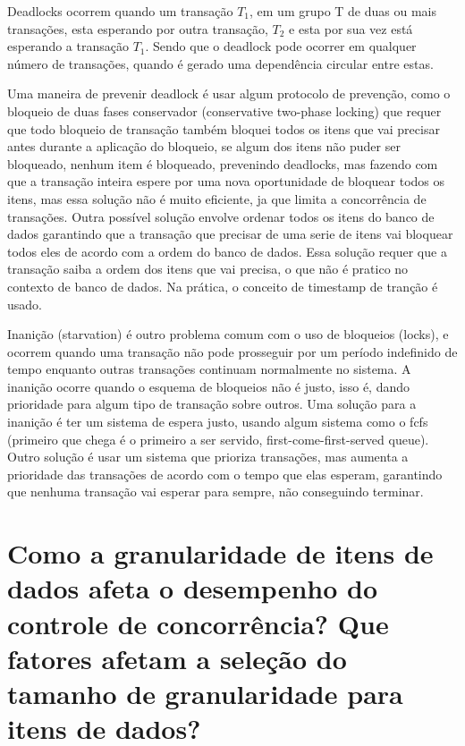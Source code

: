 \documentclass[a4paper,10pt]{article}
\begin{document}
Deadlocks ocorrem quando um transação $T_1$, em um grupo T de duas ou mais transações, esta esperando por outra transação, $T_2$ e esta por sua vez está esperando a transação $T_1$. Sendo que o deadlock pode ocorrer em qualquer número de transações, quando é gerado uma dependência circular entre estas.

Uma maneira de prevenir deadlock é usar algum protocolo de prevenção, como o bloqueio de duas fases conservador (conservative two-phase locking) que requer que todo bloqueio de  transação também bloquei todos os itens que vai precisar antes durante a aplicação do bloqueio, se algum dos itens não puder ser bloqueado, nenhum item é bloqueado, prevenindo deadlocks, mas fazendo com que a transação inteira espere por uma nova oportunidade de bloquear todos os itens, mas essa solução não é muito eficiente, ja que limita a concorrência de transações.
Outra possível solução envolve ordenar todos os itens do banco de dados garantindo que a transação que precisar de uma serie de itens vai bloquear todos eles de acordo com a ordem do banco de dados. Essa solução requer que a transação saiba a ordem dos itens que vai precisa, o que não é pratico no contexto de banco de dados. Na prática, o conceito de timestamp de tranção é usado.

Inanição (starvation) é outro problema comum com o uso de bloqueios (locks), e ocorrem quando uma transação não pode prosseguir por um período indefinido de tempo enquanto outras transações continuam normalmente no sistema. A inanição ocorre quando o esquema de bloqueios não é justo, isso é, dando prioridade para algum tipo de transação sobre outros.
Uma solução para a inanição é ter um sistema de espera justo, usando algum sistema como o fcfs (primeiro que chega é o primeiro a ser servido, first-come-first-served queue). Outro solução é usar um sistema que prioriza transações, mas aumenta a prioridade das transações de acordo com o tempo que elas esperam, garantindo que nenhuma transação vai esperar para sempre, não conseguindo terminar.

\section{Como a granularidade de itens de dados afeta o desempenho do controle de concorrência? Que fatores afetam a seleção do tamanho de granularidade para itens de dados?}
\end{document}
